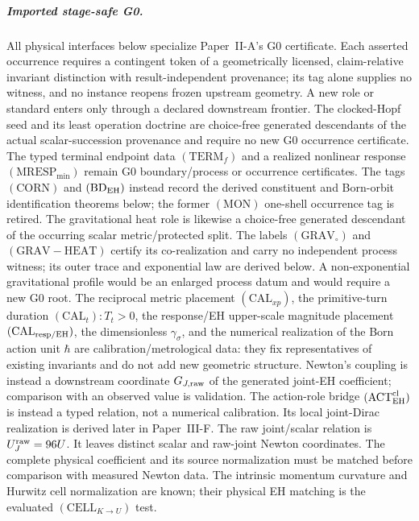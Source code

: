 \documentclass[12pt,a4paper]{article}
\begin{document}
\subparagraph{Imported stage-safe G0.}
All physical interfaces below specialize Paper~II-A's G0 certificate.  Each
asserted occurrence requires a contingent token of a geometrically licensed,
claim-relative invariant distinction with result-independent provenance; its
tag alone supplies no witness, and no instance reopens frozen upstream
geometry.  A new role or standard enters only through a declared downstream
frontier.  The clocked-Hopf seed and its least operation doctrine are
choice-free generated descendants of the actual scalar-succession provenance
and require no new G0 occurrence certificate.  The typed terminal endpoint
data \((\mathrm{TERM}_{f})\) and a realized nonlinear response
\((\mathrm{MRESP}_{\min})\) remain G0 boundary/process or occurrence
certificates.
The tags \((\mathrm{CORN})\) and
\((\mathrm{BD}_{\rm EH})\) instead record the derived constituent and
Born-orbit identification theorems below; the former \((\mathrm{MON})\)
one-shell occurrence tag is retired.  The gravitational heat role is likewise
a choice-free generated descendant of the occurring scalar metric/protected
split.  The labels \((\mathrm{GRAV}_{\circ})\) and
\((\mathrm{GRAV\!-\!HEAT})\) certify its co-realization and carry no
independent process witness; its outer trace and exponential law are derived
below.  A non-exponential gravitational profile would be an enlarged process
datum and would require a new G0 root.  The reciprocal metric placement
\((\mathrm{CAL}_{xp})\), the primitive-turn duration
\((\mathrm{CAL}_t):T_t>0\), the response/EH upper-scale magnitude placement
\((\mathrm{CAL}_{\rm resp/EH})\), the dimensionless
\(\gamma_\sigma\), and the numerical realization of the Born action unit
\(\hbar\) are calibration/metrological data: they fix representatives of
existing invariants and do not add new geometric structure.  Newton's
coupling is instead a downstream coordinate \(G_{J,\rm raw}\) of the generated
joint-EH coefficient; comparison with an observed value is validation.  The action-role bridge
\((\mathrm{ACT}_{\rm EH}^{\rm cl})\) is instead a typed relation, not a
numerical calibration.  Its local joint-Dirac realization is derived later in
Paper~III-F.  The raw joint/scalar relation is $U_J^{\rm raw}=96U$. It leaves distinct
scalar and raw-joint Newton coordinates. The complete physical coefficient
and its source normalization must be matched before comparison with measured
Newton data. The intrinsic momentum curvature and Hurwitz cell normalization
are known; their physical EH matching is the evaluated
$(\mathrm{CELL}_{K\to U})$ test.
\end{document}
